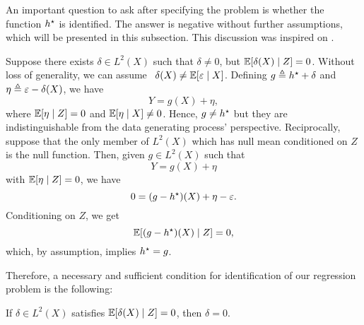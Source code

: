 An important question to ask after specifying the problem is whether the function $ h^{ \star } $ is identified.
The answer is negative without further assumptions, which will be presented in this subsection.
This discussion was inspired on \cite[Section~2]{newey2003}.

Suppose there exists $ \delta \in L^{ 2 } ( X ) $ such that $ \delta \neq 0 $, but $ \mathbb{E} [ \delta ( X ) \mid Z ] = 0 $.
Without loss of generality, we can assume\footnotemark~ $ \delta ( X ) \neq \mathbb{E} [ \varepsilon \mid X ] $.
Defining $ g \triangleq h^{ \star } + \delta $ and $ \eta \triangleq \varepsilon - \delta ( X ) $, we have
\begin{equation*}
    Y = g ( X ) + \eta
,\end{equation*}
where $ \mathbb{E} [ \eta \mid Z ] = 0 $ and $ \mathbb{E} [ \eta \mid X ] \neq 0 $.
Hence, $ g \neq h^{ \star } $ but they are indistinguishable from the data generating process' perspective.
Reciprocally, suppose that the only member of $ L^{ 2 } ( X ) $ which has null mean conditioned on $ Z $ is the null function.
Then, given $ g \in L^{ 2 } ( X ) $ such that
\begin{equation*}
    Y = g ( X ) + \eta
\end{equation*}
with $ \mathbb{E} [ \eta \mid Z ] = 0 $, we have
\begin{equation*}
    0 = ( g - h^{ \star } ) ( X ) + \eta - \varepsilon
.\end{equation*}
Conditioning on $ Z $, we get
\begin{equation*}
    \mathbb{E} [ ( g - h^{ \star } ) ( X ) \mid Z ] = 0
,\end{equation*}
which, by assumption, implies $ h^{ \star } = g $.

Therefore, a necessary and sufficient condition for identification of our regression problem is the following:
\begin{assump*}[Identification]
    If $ \delta \in L^{ 2 } ( X ) $ satisfies $ \mathbb{E} [ \delta ( X ) \mid Z ] = 0 $, then $ \delta = 0 $.
\end{assump*}

